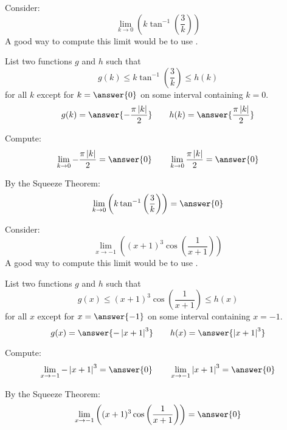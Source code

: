 \documentclass{ximera}
\begin{document}
\begin{exercise}


Consider:
\[
\lim_{k\to 0} \left(k \tan ^{-1}\left(\frac{3}{k}\right)\right)
\]
A good way to compute this limit would be to use .
\begin{exercise}
List two functions $g$ and $h$ such that
\[
g(k)\le k \tan ^{-1}\left(\frac{3}{k}\right) \le h(k)
\]
for all $k$ except for $k=\answer{0}$ on some interval containing $k=0$.
\[
g(k)=\answer{-\frac{\pi  \left| k\right| }{2}}\qquad h(k) =\answer{\frac{\pi  \left| k\right| }{2}}
\]
\begin{exercise}
Compute:
\[
\lim_{k \to 0}-\frac{\pi  \left| k\right| }{2} = \answer{0}\qquad \lim_{k\to 0}\frac{\pi  \left| k\right| }{2} = \answer{0}
\]
\begin{exercise}
By the Squeeze Theorem:
\[
\lim_{k\to 0} \left(k \tan ^{-1}\left(\frac{3}{k}\right)\right) = \answer{0}
\]
\end{exercise}
\end{exercise}
\end{exercise}
\end{exercise}



\begin{exercise}


Consider:
\[
\lim_{x\to -1} \left((x+1)^3 \cos \left(\frac{1}{x+1}\right)\right)
\]
A good way to compute this limit would be to use .
\begin{exercise}
List two functions $g$ and $h$ such that
\[
g(x)\le (x+1)^3 \cos \left(\frac{1}{x+1}\right) \le h(x)
\]
for all $x$ except for $x=\answer{-1}$ on some interval containing $x=-1$.
\[
g(x)=\answer{-\left| x+1\right| ^3}\qquad h(x) =\answer{\left| x+1\right| ^3}
\]
\begin{exercise}
Compute:
\[
\lim_{x \to -1}-\left| x+1\right| ^3 = \answer{0}\qquad \lim_{x\to -1}\left| x+1\right| ^3 = \answer{0}
\]
\begin{exercise}
By the Squeeze Theorem:
\[
\lim_{x\to -1} \left((x+1)^3 \cos \left(\frac{1}{x+1}\right)\right) = \answer{0}
\]
\end{exercise}
\end{exercise}
\end{exercise}
\end{exercise}
\end{document}
